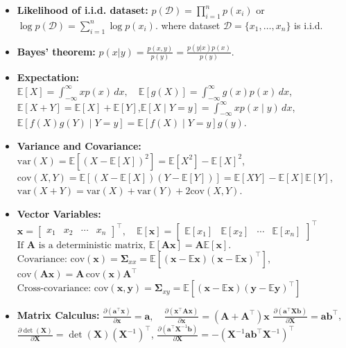 \documentclass[10pt]{article}
\begin{document}
\begin{multicols*}{2}
\begin{itemize}[label=$\cdot$,leftmargin=0pt]
\item\textbf{Likelihood of i.i.d. dataset:} 
$p(\mathcal{D}) = \prod_{i=1}^{n} p(x_i)$ or $\log p(\mathcal{D}) = \sum_{i=1}^{n} \log p(x_i)$. 
where dataset \( \mathcal{D} = \{x_1, \dots, x_n\} \) is i.i.d.
\item\textbf{Bayes' theorem:}
$p(x | y) = \frac{p(x,y)}{p(y)} = \frac{p(y | x) p(x)}{p(y)}$.
\item\textbf{Expectation:}  %
$\mathbb{E}[X] = \int_{-\infty}^{\infty} x p(x) \,dx, \quad \mathbb{E}[g(X)] = \int_{-\infty}^{\infty} g(x) p(x) \,dx$,\quad
$\mathbb{E}[X + Y] = \mathbb{E}[X] + \mathbb{E}[Y]$,\quad$\mathbb{E}[X \mid Y = y] = \int_{-\infty}^{\infty} x p(x \mid y) \,dx$,\quad
$\mathbb{E}[f(X) g(Y) \mid Y = y] = \mathbb{E}[f(X) \mid Y = y] g(y)$.
\item\textbf{Variance and Covariance:}  %
$\text{var}(X) = \mathbb{E}[(X - \mathbb{E}[X])^2] = \mathbb{E}[X^2] - \mathbb{E}[X]^2$,\quad
$\text{cov}(X,Y) = \mathbb{E}[(X - \mathbb{E}[X])(Y - \mathbb{E}[Y])] = \mathbb{E}[XY] - \mathbb{E}[X] \mathbb{E}[Y]$,\quad
$\text{var}(X + Y) = \text{var}(X) + \text{var}(Y) + 2 \text{cov}(X,Y)$.
\item \textbf{Vector Variables:}
$
\mathbf{x} =
\begin{bmatrix}
x_1 & x_2 & \cdots & x_n
\end{bmatrix}^{\top}, \quad
\mathbb{E}[\mathbf{x}] =
\begin{bmatrix}
\mathbb{E}[x_1] & \mathbb{E}[x_2] & \cdots & \mathbb{E}[x_n]
\end{bmatrix}^{\top}
$\quad
$\text{If } \mathbf{A} \text{ is a deterministic matrix, } \mathbb{E}[\mathbf{A} \mathbf{x}] = \mathbf{A} \mathbb{E}[\mathbf{x}].$\quad
$\text{Covariance: } \text{cov}(\mathbf{x}) = \mathbf{\Sigma}_{xx} = \mathbb{E}[(\mathbf{x} - \mathbb{E}\mathbf{x})(\mathbf{x} - \mathbb{E}\mathbf{x})^\top],$\quad
$\text{cov}(\mathbf{A} \mathbf{x}) = \mathbf{A} \, \text{cov}(\mathbf{x}) \mathbf{A}^\top$\quad
$\text{Cross-covariance: } \text{cov}(\mathbf{x}, \mathbf{y}) = \mathbf{\Sigma}_{xy} = \mathbb{E}[(\mathbf{x} - \mathbb{E}\mathbf{x})(\mathbf{y} - \mathbb{E}\mathbf{y})^\top]$
\item \textbf{Matrix Calculus:}
$\frac{\partial (\mathbf{a}^\top \mathbf{x})}{\partial \mathbf{x}} = \mathbf{a}, \quad
\frac{\partial (\mathbf{x}^\top \mathbf{A} \mathbf{x})}{\partial \mathbf{x}} = (\mathbf{A} + \mathbf{A}^\top) \mathbf{x}$\quad
$\frac{\partial (\mathbf{a}^\top \mathbf{X} \mathbf{b})}{\partial \mathbf{X}} = \mathbf{a} \mathbf{b}^\top$, \quad
$\frac{\partial \det(\mathbf{X})}{\partial \mathbf{X}} = \det(\mathbf{X}) (\mathbf{X}^{-1})^\top$, \quad
$\frac{\partial (\mathbf{a}^\top \mathbf{X}^{-1} \mathbf{b})}{\partial \mathbf{X}} = -(\mathbf{X}^{-1} \mathbf{a} \mathbf{b}^\top \mathbf{X}^{-1})^\top$


\end{itemize}
\end{multicols*}
\end{document}
